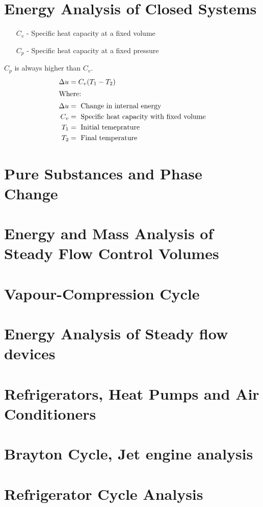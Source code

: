 \documentclass[12pt,a4paper]{article}
\begin{document}
\newpage

\section{Energy Analysis of Closed Systems}
    \begin{itemize}
        \item[$C_v$ -] Specific heat capacity at a fixed volume
        \item[$C_p$ -] Specific heat capacity at a fixed pressure 
    \end{itemize}
    $C_p$ is always higher than $C_v$. \\

    \begin{align}
        \Delta u&=C_v(T_1-T_2) \\
        \intertext{Where: }
        \Delta u&=\text{ Change in internal energy} \nonumber \\
        C_v&=\text{ Specific heat capacity with fixed volume} \nonumber \\
        T_1&=\text{ Initial temeprature} \nonumber\\
        T_2&=\text{ Final temperature} \nonumber
    \end{align} 
\newpage

\section{Pure Substances and Phase Change}

\newpage

\section{Energy and Mass Analysis of Steady Flow Control Volumes}

\newpage

\section{Vapour-Compression Cycle}

\newpage

\section{Energy Analysis of Steady flow devices}

\newpage

\section{Refrigerators, Heat Pumps and Air Conditioners}

\newpage

\section{Brayton Cycle, Jet engine analysis}

\newpage

\section{Refrigerator Cycle Analysis}
\end{document}
